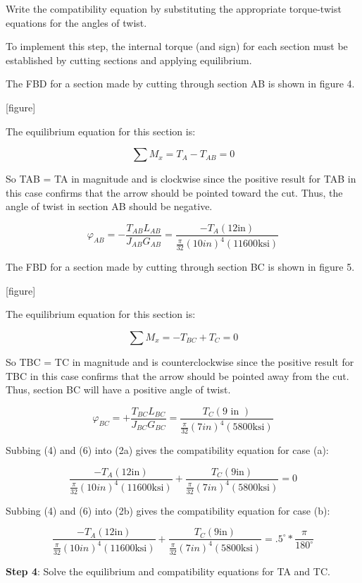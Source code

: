 \documentclass[
  letterpaper,
  DIV=11,
  numbers=noendperiod]{scrreprt}
\begin{document}
\begin{tcolorbox}
\begin{tcolorbox}
Write the compatibility equation by substituting the appropriate
torque-twist equations for the angles of twist.

To implement this step, the internal torque (and sign) for each section
must be established by cutting sections and applying equilibrium.

The FBD for a section made by cutting through section AB is shown in
figure 4.

{[}figure{]}

The equilibrium equation for this section is:

\[
\sum M_x=T_A-T_{A B}=0
\]

So TAB = TA in magnitude and is clockwise since the positive result for
TAB in this case confirms that the arrow should be pointed toward the
cut. Thus, the angle of twist in section AB should be negative.

\[
\varphi_{A B}=-\frac{T_{A B} L_{A B}}{J_{A B} G_{A B}}=\frac{-T_A(12 \mathrm{in})}{\frac{\pi}{32}(10 i n)^4(11600 \mathrm{ksi})}
\]

The FBD for a section made by cutting through section BC is shown in
figure 5.

{[}figure{]}

The equilibrium equation for this section is:

\[
\sum M_x=-T_{B C}+T_C=0
\]

So TBC = TC in magnitude and is counterclockwise since the positive
result for TBC in this case confirms that the arrow should be pointed
away from the cut. Thus, section BC will have a positive angle of twist.

\[
\varphi_{B C}=+\frac{T_{B C} L_{B C}}{J_{B C} G_{B C}}=\frac{T_C(9 \text { in })}{\frac{\pi}{32}(7 i n)^4(5800 \mathrm{ksi})}
\]

Subbing (4) and (6) into (2a) gives the compatibility equation for case
(a):

\[
\frac{-T_A(12 \mathrm{in})}{\frac{\pi}{32}(10 i n)^4(11600 \mathrm{ksi})}+\frac{T_C(9 \mathrm{in})}{\frac{\pi}{32}(7 i n)^4(5800 \mathrm{ksi})}=0
\]

Subbing (4) and (6) into (2b) gives the compatibility equation for case
(b):

\[
\frac{-T_A(12 \mathrm{in})}{\frac{\pi}{32}(10 i n)^4(11600 \mathrm{ksi})}+\frac{T_C(9 \mathrm{in})}{\frac{\pi}{32}(7 i n)^4(5800 \mathrm{ksi})}=.5^{\circ} * \frac{\pi}{180^{\circ}}
\]

\textbf{Step 4}: Solve the equilibrium and compatibility equations for
TA and TC.


\end{tcolorbox}
\end{tcolorbox}
\end{document}
